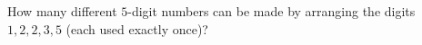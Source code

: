 How many different $5$-digit numbers can be made by arranging the digits $1,2,2,3,5$ (each used exactly once)?
